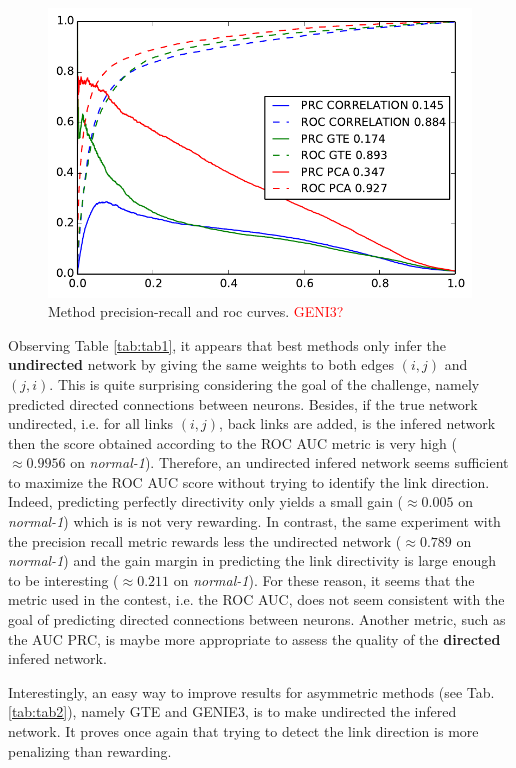 \documentclass[wcp]{jmlr}
\begin{document}
\begin{figure}[bth]
\centering
\includegraphics[width=0.6\linewidth]{images/curves}
\caption{Method precision-recall and roc curves. \textcolor{red}{GENI3?}}
\label{fig:curves}
\end{figure}





Observing Table \ref{tab:tab1}, it appears that best methods only infer the
\textbf{undirected} network by giving the same weights to both edges $(i,j)$
and $(j,i)$. This is quite surprising considering the goal of the challenge,
namely predicted directed connections between neurons. Besides, if the true
network undirected, i.e. for all links $(i,j)$, back links are added, is the
infered network then the score obtained according to the ROC AUC metric is
very high ($\approx 0.9956$ on \textit{normal-1}). Therefore, an undirected
infered network seems sufficient to maximize the ROC AUC score without trying
to identify the link direction. Indeed, predicting perfectly directivity only
yields a small gain ($\approx 0.005$ on \textit{normal-1}) which is is not
very rewarding. In contrast, the same experiment with the precision recall
metric rewards less the undirected network ($\approx 0.789$ on
\textit{normal-1}) and the gain margin in predicting the link directivity is
large enough to be interesting ($\approx 0.211$ on \textit{normal-1}). For
these reason, it seems that the metric used in the contest, i.e. the ROC AUC,
does not seem consistent with the goal of predicting directed connections
between neurons. Another metric, such as the AUC PRC, is maybe more
appropriate to assess the quality of the \textbf{directed} infered network.

Interestingly, an easy way to improve results for asymmetric methods (see
Tab.\ref{tab:tab2}), namely GTE and GENIE3, is to make undirected the infered
network. It proves once again that trying to detect the link direction is more
penalizing than rewarding.
\end{document}

